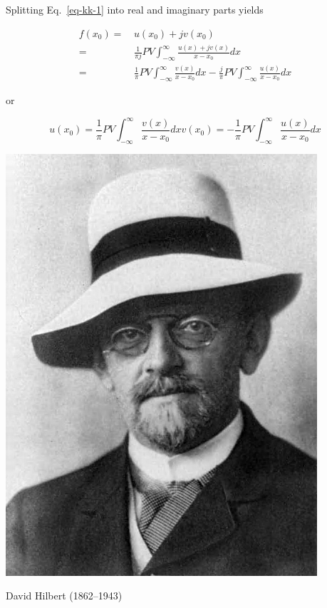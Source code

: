 Splitting Eq.~\ref{eq-kk-1} into real and imaginary parts yields

\begin{align}
f(x_0) =& \, u(x_0) + jv(x_0) \nonumber \\
       =& \, \frac{1}{\pi j} PV \int_{- \infty}^{\infty} \frac{u(x)+jv(x)}{x-x_0}dx
 \nonumber \\
       =& \, \frac{1}{\pi} PV \int_{- \infty}^{\infty} \frac{v(x)}{x-x_0}dx -
\frac{j}{\pi} PV \int_{- \infty}^{\infty} \frac{u(x)}{x-x_0}dx
\end{align}

or

\begin{subequations} 
\begin{equation}
u(x_0) = \frac{1}{\pi} PV \int_{- \infty}^{\infty} \frac{v(x)}{x-x_0}dx
\end{equation} 
\begin{equation}
v(x_0) = -\frac{1}{\pi} PV \int_{- \infty}^{\infty} \frac{u(x)}{x-x_0}dx
\end{equation}
\label{eq-KK}
\end{subequations}

\begin{marginfigure}[-1.5cm]
  \includegraphics{complex/figures/d_hilbert}
  \caption{David Hilbert (1862–1943)}
\end{marginfigure}

